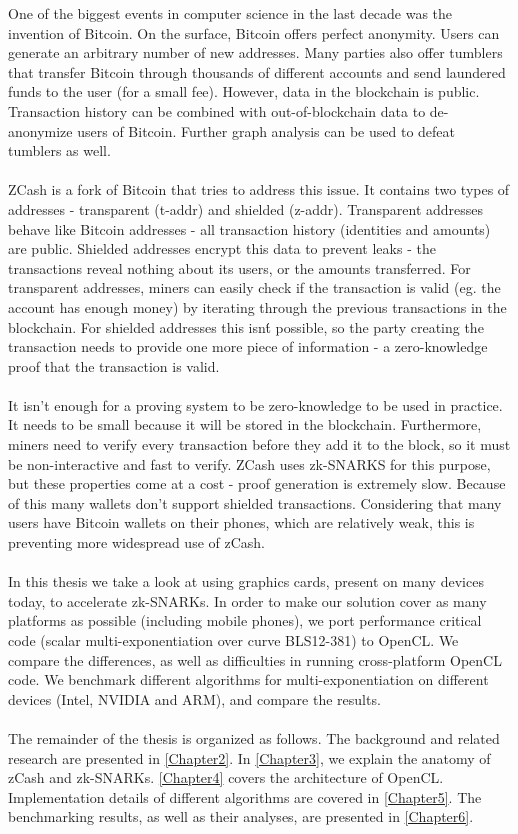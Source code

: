 One of the biggest events in computer science in the last decade was the invention of Bitcoin. On the surface, Bitcoin offers perfect anonymity. Users can generate an arbitrary number of new addresses. Many parties also offer tumblers that transfer Bitcoin through thousands of different accounts and send laundered funds to the user (for a small fee). However, data in the blockchain is public. Transaction history can be combined with out-of-blockchain data to de-anonymize users of Bitcoin. Further graph analysis can be used to defeat tumblers as well.\\
\\
ZCash is a fork of Bitcoin that tries to address this issue. It contains two types of addresses - transparent (t-addr) and shielded (z-addr). Transparent addresses behave like Bitcoin addresses - all transaction history (identities and amounts) are public. Shielded addresses encrypt this data to prevent leaks - the transactions reveal nothing about its users, or the amounts transferred. For transparent addresses, miners can easily check if the transaction is valid (eg. the account has enough money) by iterating through the previous transactions in the blockchain. For shielded addresses this isn\'t possible, so the party creating the transaction needs to provide one more piece of information - a zero-knowledge proof that the transaction is valid. \\
\\
It isn't enough for a proving system to be zero-knowledge to be used in practice. It needs to be small because it will be stored in the blockchain. Furthermore, miners need to verify every transaction before they add it to the block, so it must be non-interactive and fast to verify. ZCash uses zk-SNARKS for this purpose, but these properties come at a cost - proof generation is extremely slow.
Because of this many wallets don't support shielded transactions. Considering that many users have Bitcoin wallets on their phones, which are relatively weak, this is preventing more widespread use of zCash.\\
\\
In this thesis we take a look at using graphics cards, present on many devices today, to accelerate zk-SNARKs. In order to make our solution cover as many platforms as possible (including mobile phones), we port performance critical code (scalar multi-exponentiation over curve BLS12-381) to OpenCL. We compare the differences, as well as difficulties in running cross-platform OpenCL code. We benchmark different algorithms for multi-exponentiation on different devices (Intel, NVIDIA and ARM), and compare the results.\\
\\
The remainder of the thesis is organized as follows. The background and related research are presented in \ref{Chapter2}. In \ref{Chapter3}, we explain the anatomy of zCash and zk-SNARKs. \ref{Chapter4} covers the architecture of OpenCL. Implementation details of different algorithms are covered in \ref{Chapter5}. The benchmarking results, as well as their analyses, are presented in \ref{Chapter6}.
